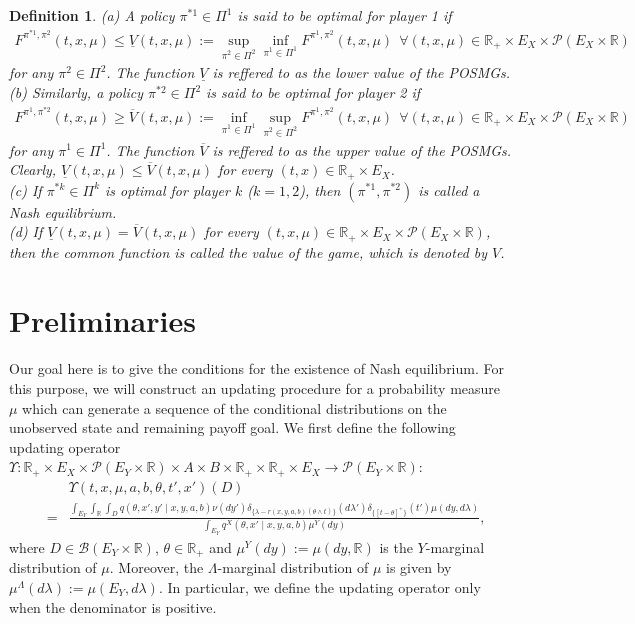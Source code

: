 \documentclass[12pt]{article}
\newtheorem{definition}{Definition}
\begin{document}
\begin{definition}
	(a)	A policy $\pi^{*1}\in \Pi^1$ is said to be optimal for player 1 if
	\begin{eqnarray*}
		F^{\pi^{*1},\pi^2}(t,x,\mu)\leq \underline{V}(t,x,\mu)
		:=\sup_{\pi^2\in\Pi^2}\inf_{\pi^1\in\Pi^1}F^{\pi^1,\pi^2}(t,x,\mu)
		~~\forall  (t,x,\mu)\in \mathbb{R}_+\times E_X\times \mathscr{P}(E_X\times \mathbb{R})
	\end{eqnarray*}
	for any $\pi^2\in\Pi^2$.
	The function $\underline{V}$ is reffered to as the lower value of the POSMGs.
	\\(b) Similarly, a policy $\pi^{*2}\in \Pi^2$ is said to be optimal for player 2 if
	\begin{eqnarray*}
		F^{\pi^1,\pi^{*2}}(t,x,\mu)\ge \overline{V}(t,x,\mu)
		:=\inf_{\pi^1\in\Pi^1}\sup_{\pi^2\in\Pi^2}F^{\pi^1,\pi^2}(t,x,\mu)
		~~\forall  (t,x,\mu)\in \mathbb{R}_+\times E_X\times \mathscr{P}(E_X\times \mathbb{R})
	\end{eqnarray*}
	for any $\pi^1\in\Pi^1$.
	The function $\overline{V}$ is reffered to as the upper value of the POSMGs.
	\\Clearly, $\underline{V}(t,x,\mu)\leq \overline{V}(t,x,\mu)$ for every
	$ (t,x)\in \mathbb{R}_+\times E_X$.\\
	(c) If $\pi^{*k}\in\Pi^k$ is optimal for player $k$ ($k=1,2$), then
	$(\pi^{*1},\pi^{*2})$ is called a Nash equilibrium.\\
	(d) If
	$\underline{V}(t,x,\mu)=\overline{V}(t,x,\mu)$
	for every $  (t,x,\mu)\in \mathbb{R}_+\times E_X\times \mathscr{P}(E_X\times \mathbb{R})$, then the common function is called the value of the game, which is denoted by $V$.
\end{definition}

\section{Preliminaries}\label{sec3}

Our goal here is to give the conditions for the existence of Nash equilibrium. For this purpose, we will construct an updating procedure for a probability measure $\mu$ which can generate a sequence of the conditional distributions on the unobserved state and remaining payoff goal.
We first define the following updating operator
$\Upsilon: \mathbb{R}_+\times E_X\times \mathscr{P}(E_Y\times \mathbb{R})\times A\times B \times \mathbb{R}_+\times \mathbb{R}_+\times E_X\to \mathscr{P}(E_Y\times \mathbb{R}):$
\begin{eqnarray}
&&\Upsilon(t,x,\mu,a,b,\theta,t',x')(D)\nonumber\\
&=&\frac{\int_{E_Y}\int_{\mathbb{R}}\int_{D}q(\theta,x',y'\mid x,y, a, b)\nu(dy')\delta_{\{\lambda-r(x,y,a,b)(\theta\wedge t)\}}(d\lambda')\delta_{\{[t-\theta]^+\}}(t')\mu(dy,d\lambda)}{\int_{E_Y}q^X(\theta,x'\mid x,y,a,b)\mu^Y(dy)},
\end{eqnarray}
where $D\in\mathscr{B}(E_Y\times\mathbb{R})$, $\theta\in\mathbb{R}_+$ and $\mu^Y(dy):=\mu(dy,\mathbb{R})$ is the $Y$-marginal distribution of $\mu$.
Moreover, the $\Lambda$-marginal distribution of $\mu$ is given by $\mu^{\Lambda}(d\lambda):=\mu(E_Y,d\lambda)$.
In particular, we define the updating operator only when the denominator is positive.
\end{document}
